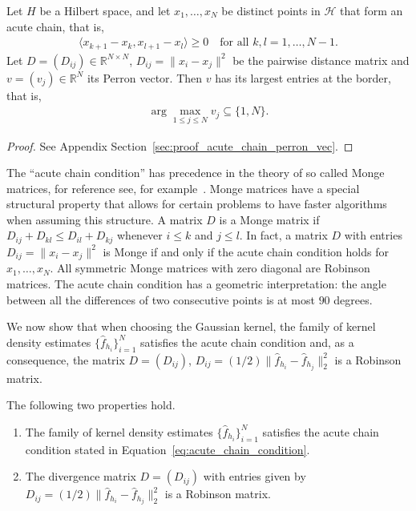 \begin{Lem}\label{lem:acute_chain_perron_vec}
    Let $H$ be a Hilbert space, and let $x_1,\dots,x_N$ be distinct points in $\mathcal{H}$ that form an acute chain, that is,
    \begin{align}\label{eq:acute_chain_condition}
        \langle x_{k+1}-x_k,x_{l+1}-x_l\rangle\ge0\quad\text{for all }k,l=1,\dots,N-1.
    \end{align}
    Let $D=(D_{ij})\in\mathbb{R}^{N\times N}$, $D_{ij}=\|x_i-x_j\|^2$ be the pairwise distance matrix and $v=(v_j)\in\mathbb{R}^N$ its Perron vector. Then $v$ has its largest entries at the border, that is,
    \begin{align*}
        \arg\max_{1\le j\le N}v_j\subseteq\{1,N\}.
    \end{align*}
\end{Lem}

\begin{proof}
    See Appendix Section~\ref{sec:proof_acute_chain_perron_vec}.
\end{proof}

The \enquote{acute chain condition} has precedence in the theory of so called Monge matrices, for reference see, for example~\cite{hutter_estimation_2020}. Monge matrices have a special structural property that allows for certain problems to have faster algorithms when assuming this structure. A matrix $D$ is a Monge matrix if $D_{ij}+D_{kl}\le D_{il}+D_{kj}$ whenever $i\le k$ and $j\le l$. In fact, a matrix $D$ with entries $D_{ij}=\|x_i-x_j\|^2$ is Monge if and only if the acute chain condition holds for $x_1,\dots,x_N$. All symmetric Monge matrices with zero diagonal are Robinson matrices. The acute chain condition has a geometric interpretation: the angle between all the differences of two consecutive points is at most $90$ degrees.

We now show that when choosing the Gaussian kernel, the family of kernel density estimates $\{\hat{f}_{h_i}\}_{i=1}^{N}$ satisfies the acute chain condition and, as a consequence, the matrix $D=(D_{ij})$, $D_{ij}=(1/2)\|\hat{f}_{h_i}-\hat{f}_{h_j}\|_2^2$ is a Robinson matrix.

\begin{Prop}\label{prop:L2_divergence_matrix}
    The following two properties hold.
    \begin{enumerate}
        \item[(a)] The family of kernel density estimates $\{\hat{f}_{h_i}\}_{i=1}^{N}$ satisfies the acute chain condition stated in Equation~\eqref{eq:acute_chain_condition}.
        \item[(b)] The divergence matrix $D=(D_{ij})$ with entries given by $D_{ij}=(1/2)\|\hat{f}_{h_i}-\hat{f}_{h_j}\|_2^2$ is a Robinson matrix.
    \end{enumerate}
\end{Prop}


